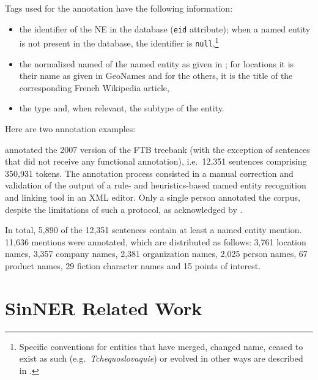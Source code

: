Tags used for the annotation have the following information:
\begin{itemize}
    \item the identifier of the NE in the \aleda database (\texttt{eid} attribute); when a named entity is not present in the database, the identifier is \texttt{null},\footnote{Specific conventions for entities that have merged, changed name, ceased to exist as such (e.g.~\emph{Tchequoslovaquie}) or evolved in other ways are described in .}
    \item the normalized named of the named entity as given in \aleda; for locations it is their name as given in GeoNames and for the others, it is the title of the corresponding French Wikipedia article,
    \item the type and, when relevant, the subtype of the entity.
\end{itemize}
Here are two annotation examples:\\

 annotated the 2007 version of the FTB treebank (with the exception of sentences that did not receive any functional annotation), i.e.~12,351 sentences comprising 350,931 tokens. The annotation process consisted in a manual correction and validation of the output of a rule- and heuristics-based named entity recognition and linking tool in an XML editor.
Only a single person annotated the corpus, despite the limitations of such a protocol, as acknowledged by .

In total, 5,890 of the 12,351 sentences contain at least a named entity mention. 11,636 mentions were annotated, which are distributed as follows:
3,761 location names, 3,357 company names, 2,381 organization names, 2,025 person names, 67 product names, 29 fiction character names and 15 points of interest.


\section{SinNER Related Work}

